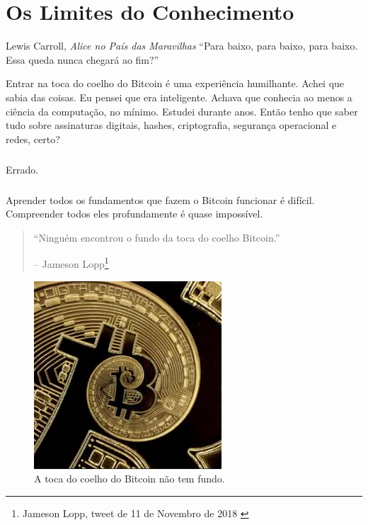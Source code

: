 \chapter{Os Limites do Conhecimento}
\label{les:7}

\begin{chapquote}{Lewis Carroll, \textit{Alice no País das Maravilhas}}
\enquote{Para baixo, para baixo, para baixo. Essa queda nunca chegará ao fim?}
\end{chapquote}

Entrar na toca do coelho do Bitcoin é uma experiência humilhante. Achei que sabia das coisas. Eu pensei que era inteligente. Achava que conhecia ao menos a ciência da computação, no mínimo. Estudei durante anos. Então tenho que saber tudo sobre assinaturas digitais, hashes, criptografia, segurança operacional e redes, certo?

\paragraph{}
Errado.

\paragraph{}
Aprender todos os fundamentos que fazem o Bitcoin funcionar é difícil. Compreender todos eles profundamente é quase impossível.

\begin{quotation}\begin{samepage}
\enquote{Ninguém encontrou o fundo da toca do coelho Bitcoin.}
\begin{flushright} -- Jameson Lopp\footnote{Jameson Lopp, tweet de 11 de Novembro de 2018 \cite{lopp-tweet}}
\end{flushright}\end{samepage}\end{quotation}

\begin{figure}
  \centering
  \includegraphics[width=7cm]{assets/images/rabbit-hole-bottomless.png}
  \caption{A toca do coelho do Bitcoin não tem fundo.}
  \label{fig:rabbit-hole-bottomless}
\end{figure}

